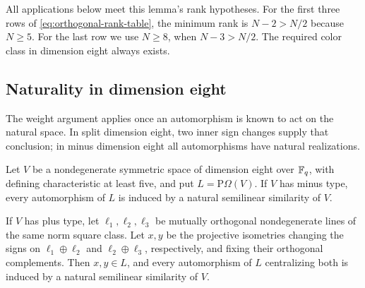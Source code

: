 All applications below meet this lemma's rank hypotheses.  For the
first three rows of \eqref{eq:orthogonal-rank-table}, the minimum rank
is $N-2>N/2$ because $N\ge5$.  For the last row we use $N\ge8$, when
$N-3>N/2$.  The required color class in dimension eight always exists.

\subsection{Naturality in dimension eight}

The weight argument applies once an automorphism is known to act on
the natural space. In split dimension eight, two inner sign changes
supply that conclusion; in minus dimension eight all automorphisms
have natural realizations.

\begin{lemma}\label{lem:orthogonal-eight-naturality}
Let $V$ be a nondegenerate symmetric space of dimension eight over
$\mathbb F_q$, with defining characteristic at least five, and put
$L=\mathrm P\Omega(V)$. If $V$ has minus type, every automorphism of
$L$ is induced by a natural semilinear similarity of $V$.

If $V$ has plus type, let $\ell_1,\ell_2,\ell_3$ be mutually orthogonal
nondegenerate lines of the same norm square class. Let $x,y$ be the
projective isometries changing the signs on $\ell_1\oplus\ell_2$ and
$\ell_2\oplus\ell_3$, respectively, and fixing their orthogonal
complements. Then $x,y\in L$, and every automorphism of $L$ centralizing
both is induced by a natural semilinear similarity of $V$.
\end{lemma}

